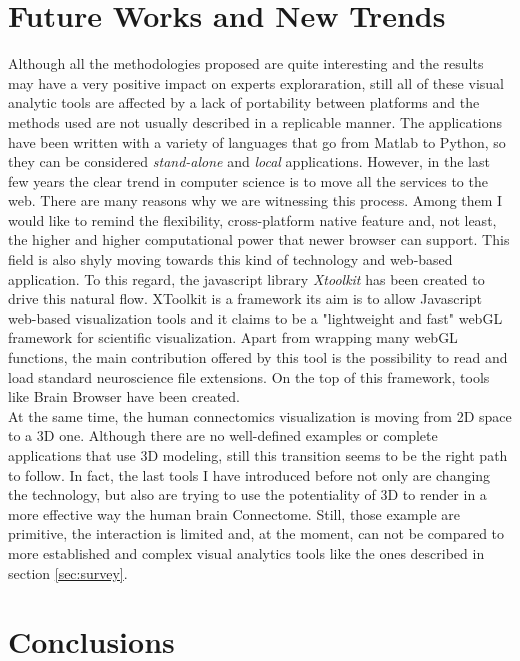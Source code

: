\documentclass{article}
\begin{document}
\begin{multicols}{2}
\section{Future Works and New Trends}
\label{sec:futureWorks}
Although all the methodologies proposed are quite interesting and the results may have a very positive impact on experts exploraration, still all of these visual analytic tools are affected by a lack of portability between platforms and the methods used are not usually described in a replicable manner. The applications have been written with a variety of languages that go from Matlab to Python, so they can be considered \textit{stand-alone} and \textit{local} applications. However, in the last few years the clear trend in computer science is to move all the services to the web. There are many reasons why we are witnessing this process. Among them I would like to remind the flexibility, cross-platform native feature and, not least, the higher and higher computational power that newer browser can support. This field is also shyly moving towards this kind of technology and web-based application. To this regard, the javascript library \textit{Xtoolkit} \cite{xToolkit} has been created to drive this natural flow. XToolkit is a framework its aim is to allow Javascript web-based visualization tools and it claims to be a "lightweight and fast" webGL framework for scientific visualization. Apart from wrapping many webGL functions, the main contribution offered by this tool is the possibility to read and load standard neuroscience file extensions. On the top of this framework, tools like Brain Browser \cite{brainBrowser} have been created. \\

At the same time, the human connectomics visualization is moving from 2D space to a 3D one. Although there are no well-defined examples or complete applications that use 3D modeling, still this transition seems to be the right path to follow. In fact, the last tools I have introduced before not only are changing the technology, but also are trying to use the potentiality of 3D to render in a more effective way the human brain Connectome. Still, those example are primitive, the interaction is limited and, at the moment, can not be compared to more established and complex visual analytics tools like the ones described in section \ref{sec:survey}.

\section{Conclusions}
\label{sec:conclusions}
{}
  





\end{multicols}
\end{document}
